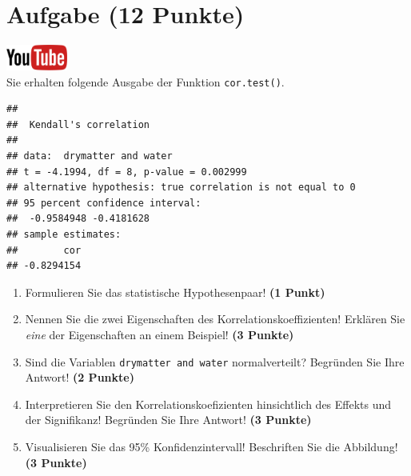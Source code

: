 \documentclass[a4paper, 10pt]{scrartcl}\usepackage[]{graphicx}\usepackage[]{xcolor}
\makeatletter
\newenvironment{kframe}{%
 \def\at@end@of@kframe{}%
 \ifinner\ifhmode%
  \def\at@end@of@kframe{\end{minipage}}%
  \begin{minipage}{\columnwidth}%
 \fi\fi%
 \def\FrameCommand##1{\hskip\@totalleftmargin \hskip-\fboxsep
 \colorbox{shadecolor}{##1}\hskip-\fboxsep
     \hskip-\linewidth \hskip-\@totalleftmargin \hskip\columnwidth}%
 \MakeFramed {\advance\hsize-\width
   \@totalleftmargin\z@ \linewidth\hsize
   \@setminipage}}%
 {\par\unskip\endMakeFramed%
 \at@end@of@kframe}
\newenvironment{knitrout}{}{} %
\makeatother
\begin{document}
 
\clearpage

\section{Aufgabe \hfill (12 Punkte)}

\hfill\href{https://youtu.be/C9skfFRTHhI}{\includegraphics[width =
   2cm]{img/youtube}}\\[1Ex]

Sie erhalten folgende \Rlogo Ausgabe der Funktion \texttt{cor.test()}.

\begin{knitrout}
\color{fgcolor}\begin{kframe}
\begin{verbatim}
## 
## 	Kendall's correlation
## 
## data:  drymatter and water
## t = -4.1994, df = 8, p-value = 0.002999
## alternative hypothesis: true correlation is not equal to 0
## 95 percent confidence interval:
##  -0.9584948 -0.4181628
## sample estimates:
##        cor 
## -0.8294154
\end{verbatim}
\end{kframe}
\end{knitrout}


\begin{enumerate}
  \item Formulieren Sie das statistische Hypothesenpaar! \textbf{(1
Punkt)}
\item Nennen Sie die zwei Eigenschaften des Korrelationskoeffizienten!
  Erkl{\"a}ren Sie \textit{eine} der Eigenschaften an einem Beispiel! \textbf{(3
    Punkte)}
\item Sind die Variablen \texttt{drymatter and water} normalverteilt?
  Begr{\"u}nden Sie Ihre Antwort! \textbf{(2 Punkte)}
\item Interpretieren Sie den Korrelationskoefizienten hinsichtlich des
  Effekts und der Signifikanz! Begr{\"u}nden Sie
  Ihre Antwort! \textbf{(3 Punkte)}
\item Visualisieren Sie das 95\% Konfidenzintervall! Beschriften Sie die Abbildung! \textbf{(3 Punkte)} 
\end{enumerate} 
\clearpage
\end{document}
